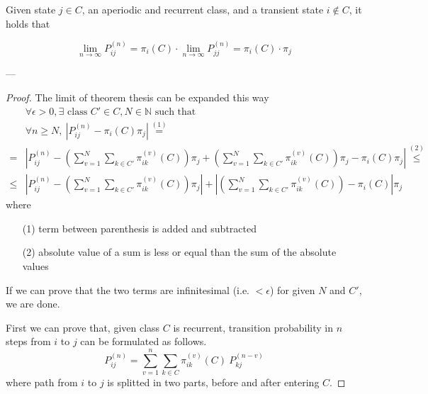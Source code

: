 	\begin{theorem}[3.1, KT p. 91] \label{th:3.1}
		Given state $j \in C$, an aperiodic and recurrent class, and a transient state $i \notin C$, it holds that

		$$ \lim_{n \to \infty } P_{ij}^{(n)} = \pi_i(C) \cdot \lim_{n \to \infty } P_{jj}^{(n)} = \pi_i(C) \cdot \pi_j $$
	\end{theorem}
	---
	\begin{proof}
		The limit of theorem thesis can be expanded this way
		\begin{equation}\begin{split} \label{eq:theorem_3.1_thesis}
			& \forall \epsilon > 0, \exists \text{ class } C' \in C, N \in \mathbb{N} \text{ such that } \\
			& \forall n \ge N,~ \left| P_{ij}^{(n)} - \pi_i(C) \pi_j \right| \stackrel{(1)}{=} \\
			= & \left| P_{ij}^{(n)} - \left( \sum_{v = 1}^{N} \sum_{k \in C'} \pi_{ik}^{(v)}(C) \right) \pi_j +
				\left( \sum_{v = 1}^{N} \sum_{k \in C'} \pi_{ik}^{(v)}(C)\right)\pi_j - \pi_i(C)\pi_j \right| \stackrel{(2)}{\le} \\
			\le & \left| P_{ij}^{(n)} - \left( \sum_{v = 1}^{N} \sum_{k \in C'} \pi_{ik}^{(v)}(C) \right) \pi_j \right| +
				\left| \left( \sum_{v = 1}^{N} \sum_{k \in C'} \pi_{ik}^{(v)}(C)\right) - \pi_i(C) \right| \pi_j
		\end{split}\end{equation}
		where
		\begin{itemize}
			\item [(1)] term between parenthesis is added and subtracted
			\item [(2)] absolute value of a sum is less or equal than the sum of the absolute values
		\end{itemize}

		If we can prove that the two terms are infinitesimal (i.e. $< \epsilon$) for given $N$ and $C'$, we are done.
		\smallbreak

		First we can prove that, given class $C$ is recurrent, transition probability in $n$ steps from $i$ to $j$ can be formulated as follows.
		\begin{equation} \label{eq:n_step_in_class}
			P_{ij}^{(n)} = \sum_{v = 1}^{n} \sum_{k \in C} \pi_{ik}^{(v)}(C) ~ P_{kj}^{(n-v)}
		\end{equation}
		where path from $i$ to $j$ is splitted in two parts, before and after entering $C$.


\end{proof}
